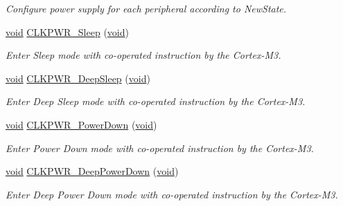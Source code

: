 \begin{DoxyCompactItemize}
\begin{DoxyCompactList}\small\item\em Configure power supply for each peripheral according to New\+State. \end{DoxyCompactList}\item 
\hyperlink{usb__devapi_8h_afabf60e7f57651d6d595a02c75f07cd0}{void} \hyperlink{group___c_l_k_p_w_r___public___functions_ga1d96df8d020a333949591ee17e45d43c}{C\+L\+K\+P\+W\+R\+\_\+\+Sleep} (\hyperlink{usb__devapi_8h_afabf60e7f57651d6d595a02c75f07cd0}{void})
\begin{DoxyCompactList}\small\item\em Enter Sleep mode with co-\/operated instruction by the Cortex-\/\+M3. \end{DoxyCompactList}\item 
\hyperlink{usb__devapi_8h_afabf60e7f57651d6d595a02c75f07cd0}{void} \hyperlink{group___c_l_k_p_w_r___public___functions_gae38c519f185eb9a6d75b88ca78a319ab}{C\+L\+K\+P\+W\+R\+\_\+\+Deep\+Sleep} (\hyperlink{usb__devapi_8h_afabf60e7f57651d6d595a02c75f07cd0}{void})
\begin{DoxyCompactList}\small\item\em Enter Deep Sleep mode with co-\/operated instruction by the Cortex-\/\+M3. \end{DoxyCompactList}\item 
\hyperlink{usb__devapi_8h_afabf60e7f57651d6d595a02c75f07cd0}{void} \hyperlink{group___c_l_k_p_w_r___public___functions_gad5722e77c3a1cbe4b036c18f16f3c50d}{C\+L\+K\+P\+W\+R\+\_\+\+Power\+Down} (\hyperlink{usb__devapi_8h_afabf60e7f57651d6d595a02c75f07cd0}{void})
\begin{DoxyCompactList}\small\item\em Enter Power Down mode with co-\/operated instruction by the Cortex-\/\+M3. \end{DoxyCompactList}\item 
\hyperlink{usb__devapi_8h_afabf60e7f57651d6d595a02c75f07cd0}{void} \hyperlink{group___c_l_k_p_w_r___public___functions_gad13f54b3d33ce0be1930d4e1d98fe58e}{C\+L\+K\+P\+W\+R\+\_\+\+Deep\+Power\+Down} (\hyperlink{usb__devapi_8h_afabf60e7f57651d6d595a02c75f07cd0}{void})
\begin{DoxyCompactList}\small\item\em Enter Deep Power Down mode with co-\/operated instruction by the Cortex-\/\+M3. \end{DoxyCompactList}\end{DoxyCompactItemize}


